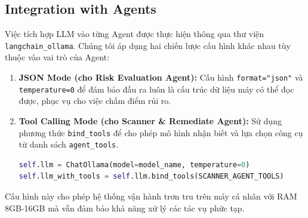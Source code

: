 \subsection{Integration with Agents}

Việc tích hợp LLM vào từng Agent được thực hiện thông qua thư viện \texttt{langchain\_ollama}. Chúng tôi áp dụng hai chiến lược cấu hình khác nhau tùy thuộc vào vai trò của Agent:

\begin{enumerate}
    \item \textbf{JSON Mode (cho Risk Evaluation Agent):}
    Cấu hình \texttt{format="json"} và \texttt{temperature=0} để đảm bảo đầu ra luôn là cấu trúc dữ liệu máy có thể đọc được, phục vụ cho việc chấm điểm rủi ro.
    
    \item \textbf{Tool Calling Mode (cho Scanner \& Remediate Agent):}
    Sử dụng phương thức \texttt{bind\_tools} để cho phép mô hình nhận biết và lựa chọn công cụ từ danh sách \texttt{agent\_tools}.
    
\begin{lstlisting}[language=Python, caption=LLM Initialization with Tools]
self.llm = ChatOllama(model=model_name, temperature=0)
self.llm_with_tools = self.llm.bind_tools(SCANNER_AGENT_TOOLS)
\end{lstlisting}
\end{enumerate}

Cấu hình này cho phép hệ thống vận hành trơn tru trên máy cá nhân với RAM 8GB-16GB mà vẫn đảm bảo khả năng xử lý các tác vụ phức tạp.




